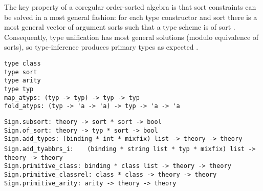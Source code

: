 \begin{isabellebody}
\begin{isamarkuptext}
  The key property of a coregular order-sorted algebra is that sort
  constraints can be solved in a most general fashion: for each type
  constructor \isa{{\isasymkappa}} and sort  there is a most general
  vector of argument sorts  such
  that a type scheme  is of sort .
  Consequently, type unification has most general solutions (modulo
  equivalence of sorts), so type-inference produces primary types as
  expected \cite{nipkow-prehofer}.%
\end{isamarkuptext}%
\isamarkuptrue%
%
\isadelimmlref
%
\endisadelimmlref
%
\isatagmlref
%
\begin{isamarkuptext}%
\begin{mldecls}
  \verb|type class| \\
  \verb|type sort| \\
  \verb|type arity| \\
  \verb|type typ| \\
  \verb|map_atyps: (typ -> typ) -> typ -> typ| \\
  \verb|fold_atyps: (typ -> 'a -> 'a) -> typ -> 'a -> 'a| \\
  \end{mldecls}
  \begin{mldecls}
  \verb|Sign.subsort: theory -> sort * sort -> bool| \\
  \verb|Sign.of_sort: theory -> typ * sort -> bool| \\
  \verb|Sign.add_types: (binding * int * mixfix) list -> theory -> theory| \\
  \verb|Sign.add_tyabbrs_i: |\isasep\isanewline%
\verb|  (binding * string list * typ * mixfix) list -> theory -> theory| \\
  \verb|Sign.primitive_class: binding * class list -> theory -> theory| \\
  \verb|Sign.primitive_classrel: class * class -> theory -> theory| \\
  \verb|Sign.primitive_arity: arity -> theory -> theory| \\
  \end{mldecls}


\end{isamarkuptext}
\end{isabellebody}
